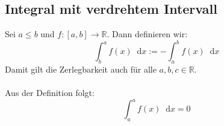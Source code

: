 \documentclass[halfparscip]{scrartcl}
\newcommand*\dif{\mathop{}\!\mathrm{d}}
\newcounter{subsection2}
\begin{document}
\subsection{Integral mit \glqq verdrehtem\grqq{} Intervall}
Sei $a \leq b$ und $f: [a,b] \rightarrow \mathbb{R}$. Dann definieren wir:\\
\begin{equation*}
	\int_b^af(x)\dif x := - \int_a^bf(x)\dif x
\end{equation*}
Damit gilt die Zerlegbarkeit auch für alle $a,b,c \in \mathbb{R}$.\\\\
Aus der Definition folgt:
\begin{equation*}
	\int_{a}^{a}f(x) \dif x = 0
\end{equation*}
\end{document}
